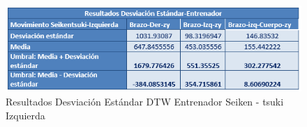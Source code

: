 \begin{figure}[H]%
	\begin{center}
		\includegraphics[scale=1]{./Figuras/Implementacion/Pruebas/Tablas/ResultadorDesvEstandar_Entrenador_Seikentsuki-Izquierdo}
	\end{center}
	\caption{Resultados Desviación Estándar DTW Entrenador Seiken - tsuki Izquierda}
	\label{fig:ResultadosDTW_Entrenador_Seikentsuki-Izquierdo}
\end{figure}
\clearpage

